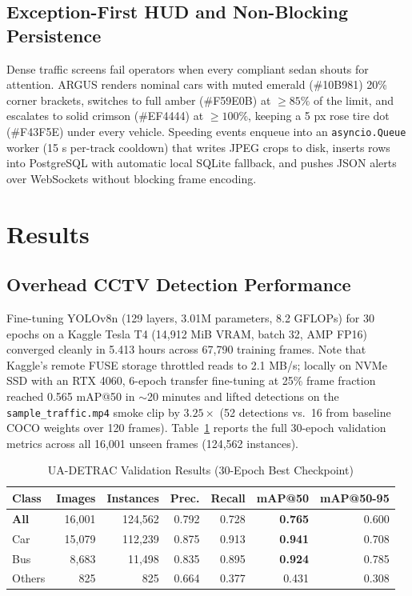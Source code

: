 \documentclass[conference]{IEEEtran}
\begin{document}
\subsection{Exception-First HUD and Non-Blocking Persistence}
Dense traffic screens fail operators when every compliant sedan shouts for attention. ARGUS renders nominal cars with muted emerald (\#10B981) 20\% corner brackets, switches to full amber (\#F59E0B) at $\ge 85\%$ of the limit, and escalates to solid crimson (\#EF4444) at $\ge 100\%$, keeping a 5 px rose tire dot (\#F43F5E) under every vehicle. Speeding events enqueue into an \texttt{asyncio.Queue} worker (15 s per-track cooldown) that writes JPEG crops to disk, inserts rows into PostgreSQL with automatic local SQLite fallback, and pushes JSON alerts over WebSockets without blocking frame encoding.

\section{Results}

\subsection{Overhead CCTV Detection Performance}
Fine-tuning YOLOv8n (129 layers, 3.01M parameters, 8.2 GFLOPs) for 30 epochs on a Kaggle Tesla T4 (14,912 MiB VRAM, batch 32, AMP FP16) converged cleanly in 5.413 hours across 67,790 training frames. Note that Kaggle's remote FUSE storage throttled reads to 2.1 MB/s; locally on NVMe SSD with an RTX 4060, 6-epoch transfer fine-tuning at 25\% frame fraction reached 0.565 mAP@50 in $\sim$20 minutes and lifted detections on the \texttt{sample\_traffic.mp4} smoke clip by $3.25\times$ (52 detections vs.\ 16 from baseline COCO weights over 120 frames). Table~\ref{tab:detrac} reports the full 30-epoch validation metrics across all 16,001 unseen frames (124,562 instances).

\begin{table}[t]
\centering
\caption{UA-DETRAC Validation Results (30-Epoch Best Checkpoint)}
\label{tab:detrac}
\begin{tabular}{lrrrrrr}
\toprule
Class & Images & Instances & Prec. & Recall & mAP@50 & mAP@50-95 \\
\midrule
\textbf{All} & 16,001 & 124,562 & 0.792 & 0.728 & \textbf{0.765} & 0.600 \\
Car & 15,079 & 112,239 & 0.875 & 0.913 & \textbf{0.941} & 0.708 \\
Bus & 8,683 & 11,498 & 0.835 & 0.895 & \textbf{0.924} & 0.785 \\
Others & 825 & 825 & 0.664 & 0.377 & 0.431 & 0.308 \\
\bottomrule
\end{tabular}
\end{table}
\end{document}
